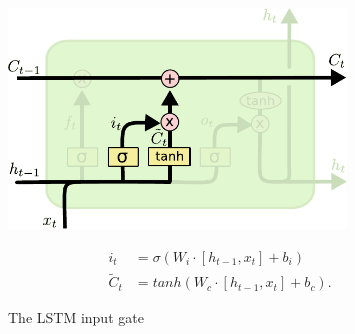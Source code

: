 \begin{figure}[p]
\begin{minipage}{0.5\textwidth}
    \centering
    \includegraphics[width=0.8\textwidth]{pdf/LSTM_input_gate.pdf}
    \caption{The LSTM input gate\label{fig:LSTM_input_gate}}
\end{minipage}
\begin{minipage}{0.5\textwidth}
    \setlength\abovedisplayshortskip{0pt}
    \setlength\belowdisplayshortskip{0pt}
    \strut
    \begin{equation}\label{eq:LSTM_input_gate}
    \begin{split}
        i_t &= \sigma\left(W_i \cdot \left[h_{t-1}, x_t\right] + b_i \right)\\
        \tilde C_t &= tanh \left(W_c \cdot \left[h_{t-1}, x_t\right] + b_c \right).
    \end{split}
    \end{equation}
    \strut
\end{minipage}
\end{figure}

